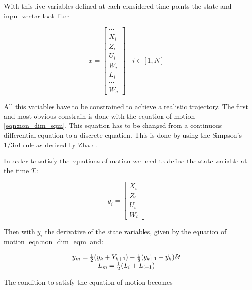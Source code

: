 \par With this five variables defined at each considered time points the state and input vector look like:

\begin{equation}
  x= 
  \begin{bmatrix}
    \cdots \\
    X_i \\
    Z_i \\
    U_i \\
    W_i \\
    L_i \\
    \cdots \\
    W_a
  \end{bmatrix}
  \quad i \in [1,N]
  \label{eqn:big_vector}
\end{equation}

\par All this variables have to be constrained to achieve a realistic trajectory.
The first and most obvious constrain is done with the equation of motion \ref{eqn:non_dim_eqm}.
This equation has to be changed from a continuous differential equation to a discrete equation.
This is done by using the Simpson's 1/3rd rule as derived by Zhao \cite{zhao2004optimal}.

In order to satisfy the equations of motion we need to define the state variable at the time $T_i$:

\begin{equation}
  y_i= \begin{bmatrix}
    X_i \\
    Z_i \\
    U_i \\
    W_i 
  \end{bmatrix}
  \label{eqn:state_i}
\end{equation}

Then with $\dot{y_i}$ the derivative of the state variables, given by the equation of motion \ref{eqn:non_dim_eqm} and:

\begin{equation}
  \begin{array}[c]{c}
    y_m= \frac{1}{2}(y_k + Y_{k+1}) - \frac{1}{8}(\dot{y_{k+1}} - \dot{y_k})\delta t \\
    L_m=\frac{1}{2}(L_i + L_{i+1})
  \end{array}
  \label{eqn:simpson_middle}
\end{equation}

The condition to satisfy the equation of motion becomes

